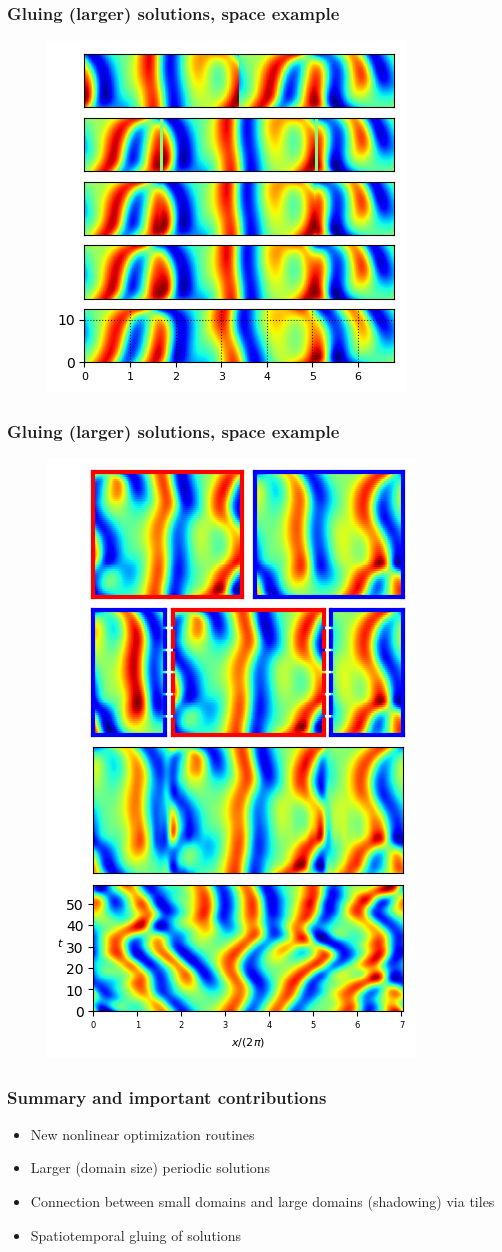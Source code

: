 \documentclass[mathserif, handout]{beamer}
\begin{document}
\begin{frame}%
  \frametitle{Gluing (larger) solutions, space example}
  \begin{figure}
  \includegraphics[width=.6\textwidth]{MNG_ppo1ppo2_space}
  \end{figure}
\end{frame}

\begin{frame}%
  \frametitle{Gluing (larger) solutions, space example}
  \begin{figure}
  \includegraphics[width=.3\textwidth]{MNG_ppo4ppo3_space}
  \end{figure}
\end{frame}


\begin{frame}
  \frametitle{Summary and important contributions}
  \begin{itemize}
  \item New nonlinear optimization routines
  \item Larger (domain size) periodic solutions
  \item Connection between small domains and large domains (shadowing) via tiles
  \item Spatiotemporal gluing of solutions
  \end{itemize}
\end{frame}
\end{document}
